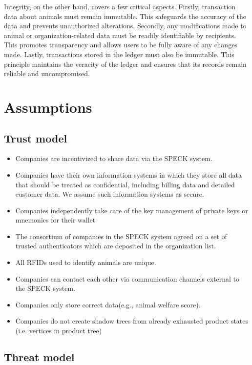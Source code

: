 \documentclass[oneside,a4paper,12pt, colorinlistoftodos]{article} %
\begin{document}
Integrity, on the other hand, covers a few critical aspects. Firstly, transaction data about animals must remain immutable. This safeguards the accuracy of the data and prevents unauthorized alterations. Secondly, any modifications made to animal or organization-related data must be readily identifiable by recipients. This promotes transparency and allows users to be fully aware of any changes made. Lastly, transactions stored in the ledger must also be immutable. This principle maintains the veracity of the ledger and ensures that its records remain reliable and uncompromised.

\section{Assumptions}
\subsection{Trust model}

\begin{itemize}
    \item Companies are incentivized to share data via the SPECK system.
    \item Companies have their own information systems in which they store all data that should be treated as confidential, including billing data and detailed customer data. We assume such information systems as secure.
    \item Companies independently take care of the key management of private keys or mnemonics for their wallet
    \item The consortium of companies in the SPECK system agreed on a set of trusted authenticators which are deposited in the organization list.
    \item All RFIDs used to identify animals are unique.
    \item Companies can contact each other via communication channels external to the SPECK system.
    \item Companies only store correct data(e.g., animal welfare score).
    \item Companies do not create shadow trees from already exhausted product states (i.e. vertices in product tree) 


    
\end{itemize}

\subsection{Threat model}
\end{document}
